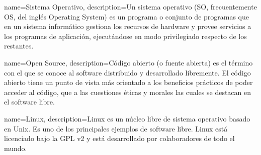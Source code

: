 



{name=Sistema Operativo,
 description={Un sistema operativo (SO, frecuentemente OS, del inglés Operating System) es un programa o conjunto de programas que en un sistema informático gestiona los recursos de hardware y provee servicios a los programas de aplicación, ejecutándose en modo privilegiado respecto de los restantes.}
 }

{name=Open Source,
 description={Código abierto (o fuente abierta) es el término con el que se conoce al software distribuido y desarrollado libremente. El código abierto tiene un punto de vista más orientado a los beneficios prácticos de poder acceder al código, que a las cuestiones éticas y morales las cuales se destacan en el software libre.}
 }

{name=Linux,
 description={Linux es un núcleo libre de sistema operativo basado en Unix. Es uno de los principales ejemplos de software libre. Linux está licenciado bajo la GPL v2 y está desarrollado por colaboradores de todo el mundo.}
 }

